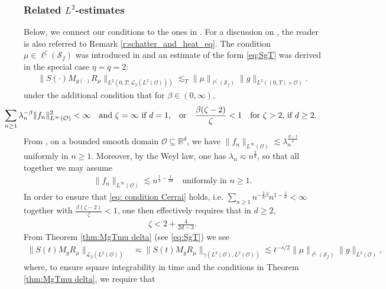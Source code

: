 \documentclass[reqno]{amsart}
\theoremstyle{plain}
\theoremstyle{remark}
\theoremstyle{plain}
\numberwithin{equation}{section}
\newcommand\cL{\mathcal{L}}
\newcommand\cO{\mathcal{O}}
\def\R{{\mathbb R}}
\newcommand{\1}{\one}
\newcommand{\Sf}{\mathcal{S}_{f}}
\begin{document}
\subsubsection{Related $L^2$-estimates} 
Below, we connect our conditions to the ones in \cite{cerrai2009khasminskii,cerrai2011averaging,cerrai2017averaging}. For a discussion on  \cite[Lemma 3.3]{C03}, the reader is also referred to Remark \ref{r:schatter_and_heat_eq}.  The condition $\mu\in \ell^\zeta(\Sf)$ was introduced in \cite{cerrai2009khasminskii} 
and an estimate of the form \eqref{eq:SgT} was derived in the special case $\eta = q=2$:
\begin{align}
\label{eq: estimate Cerrai}
\|S(\cdot)M_{g(\cdot)}R_\mu\|_{L^2(0,T;\cL_2(L^2(\cO)))}\lesssim_T   \|\mu\|_{\ell^\zeta(\Sf)}\|g\|_{L^2((0,T)\times \cO)}.
\end{align}
under  the additional condition that for $\beta\in (0,\infty)$,
\begin{align}
\hspace{-1cm}
\label{eq: condition Cerrai}
\sum_{n\geq 1} \lambda_n^{-\beta}\|f_n\|_{L^\infty(\cO)}^2<\infty\quad
\text{and $\zeta=\infty$ if $d=1$,}\quad\text{or}\quad
\frac{\beta(\zeta - 2)}{\zeta}<1
\quad\text{for $\zeta>2$, if $d\geq 2$.}
\end{align}
From \cite{grieser2002uniform}, on a bounded smooth domain $\cO\subseteq \R^d$, we have
$\|f_n\|_{L^\infty(\cO)}\lesssim \lambda_n^{\frac{d-1}{4}}$ uniformly in $n\geq 1$. Moreover, by the Weyl law, one has $\lambda_n\eqsim n^{\frac{2}{d}}$, so that all together we may assume 
\begin{align}
    \|f_n\|_{L^\infty(\cO)}\lesssim n^{\frac{1}{2}-\frac{1}{2d}}\quad\text{uniformly in  \ $n\geq 1$.}
\end{align}
In order to ensure that \eqref{eq: condition Cerrai} holds, i.e. $\sum_{n\geq 1} n^{-\frac{2}{d}\beta}n^{1-\frac{1}{d}}<\infty$ together with $\tfrac{\beta(\zeta -2)}{\zeta}<1$, one then effectively requires that in $d\geq 2$,
\begin{align}
\label{eq: condition zeta cerrai}
    \zeta<2+\frac{4}{2d-3}.
\end{align}
From Theorem \ref{thm:MgTmu delta} (see \eqref{eq:SgT}) we  see
\begin{align}
\|S(t)M_gR_\mu\|_{\cL_2(L^2(\cO))} &\eqsim 
\|S(t)M_gR_\mu\|_{\gamma(L^2(\cO),L^2(\cO))}
\lesssim t^{-s/2}\|\mu\|_{\ell^\zeta(\Sf)}\|g\|_{L^2(\cO)},
\end{align}
where, to ensure square integrability in time and the conditions in Theorem \ref{thm:MgTmu delta}, we require that 
\end{document}

